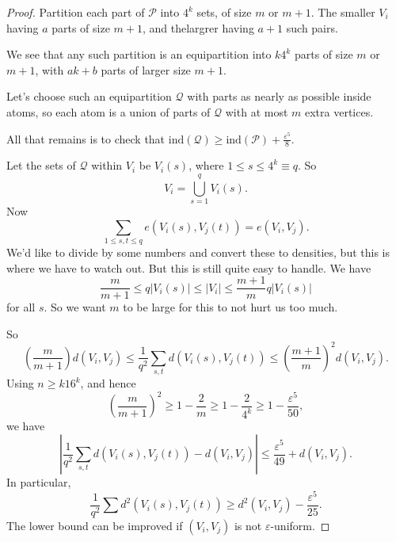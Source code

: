 \documentclass[a4paper]{article}
\newcommand\ind{\mathrm{ind}}
\begin{document}
\begin{proof}
  Partition each part of $\mathcal{P}$ into $4^k$ sets, of size $m$ or $m + 1$. The smaller $V_i$ having $a$ parts of size $m + 1$, and thelargrer having $a + 1$ such pairs.

  We see that any such partition is an equipartition into $k 4^k$ parts of size $m$ or $m + 1$, with $ak + b$ parts of larger size $m + 1$.

  Let's choose such an equipartition $\mathcal{Q}$ with parts as nearly as possible inside atoms, so each atom is a union of parts of $\mathcal{Q}$ with at most $m$ extra vertices.

  All that remains is to check that $\ind (\mathcal{Q}) \geq \ind(\mathcal{P}) + \frac{\varepsilon^5}{8}$.

  Let the sets of $\mathcal{Q}$ within $V_i$ be $V_i(s)$, where $1 \leq s \leq 4^k \equiv q$. So
  \[
    V_i = \bigcup_{s = 1}^q V_i(s).
  \]
  Now
  \[
    \sum_{1 \leq s, t \leq q} e(V_i(s), V_j(t)) = e(V_i, V_j).
  \]
  We'd like to divide by some numbers and convert these to densities, but this is where we have to watch out. But this is still quite easy to handle. We have
  \[
    \frac{m}{m + 1} \leq q |V_i(s)| \leq |V_i| \leq \frac{m + 1}{m} q |V_i(s)|
  \]
  for all $s$. So we want $m$ to be large for this to not hurt us too much.

  So
  \[
    \left(\frac{m}{m + 1}\right) d(V_i, V_j) \leq \frac{1}{q^2} \sum_{s, t} d(V_i(s), V_j(t)) \leq \left(\frac{m + 1}{m}\right)^2 d(V_i, V_j).
  \]
  Using $n \geq k 16^k$, and hence
  \[
    \left(\frac{m}{m + 1}\right)^2 \geq 1 - \frac{2}{m} \geq 1 - \frac{2}{4^k} \geq 1 - \frac{\varepsilon^5}{50},
  \]
  we have
  \[
    \left|\frac{1}{q^2} \sum_{s, t} d(V_i(s), V_j(t)) - d(V_i, V_j)\right| \leq \frac{\varepsilon^5}{49} + d(V_i, V_j). %
  \]
  In particular,
  \[
    \frac{1}{q^2} \sum d^2(V_i(s), V_j(t)) \geq d^2(V_i, V_j) - \frac{\varepsilon^5}{25}.
  \]
  The lower bound can be improved if $(V_i, V_j)$ is not $\varepsilon$-uniform.


\end{proof}
\end{document}
